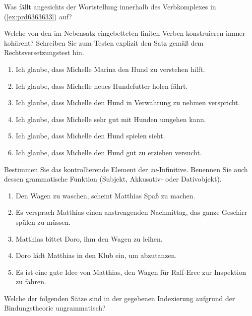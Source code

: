 \Np

\Uebung[\tristar] \label{u136a} Was fällt angesichts der Wortstellung innerhalb des Verbkomplexes in (\ref{ex:prd6363633}) auf?

\begin{exe}
\end{exe}

\Uebung \label{u137} Welche von den im Nebensatz eingebetteten finiten Verben konstruieren immer kohärent?
Schreiben Sie zum Testen explizit den Satz gemäß dem Rechtsversetzungstest hin.

\begin{enumerate}\Lf
  \item Ich glaube, dass Michelle Marina den Hund zu verstehen hilft.
  \item Ich glaube, dass Michelle neues Hundefutter holen fährt.
  \item Ich glaube, dass Michelle den Hund in Verwahrung zu nehmen verspricht.
  \item Ich glaube, dass Michelle sehr gut mit Hunden umgehen kann.
  \item Ich glaube, dass Michelle den Hund spielen sieht.
  \item Ich glaube, dass Michelle den Hund gut zu erziehen versucht.
\end{enumerate}

\Uebung \label{u138} Bestimmen Sie das kontrollierende Element der \textit{zu}-Infinitive.
Benennen Sie auch dessen grammatische Funktion (Subjekt, Akkusativ- oder Dativobjekt).

\begin{enumerate}\Lf
  \item Den Wagen zu waschen, scheint Matthias Spaß zu machen.
  \item Es versprach Matthias einen anstrengenden Nachmittag, das ganze Geschirr spülen zu müssen.
  \item Matthias bittet Doro, ihm den Wagen zu leihen.
  \item Doro lädt Matthias in den Klub ein, um abzutanzen.
  \item Es ist eine gute Idee von Matthias, den Wagen für Ralf-Erec zur Inspektion zu fahren.
\end{enumerate}

\Uebung \label{u139} Welche der folgenden Sätze sind in der gegebenen Indexierung aufgrund der Bindungstheorie ungrammatisch?

